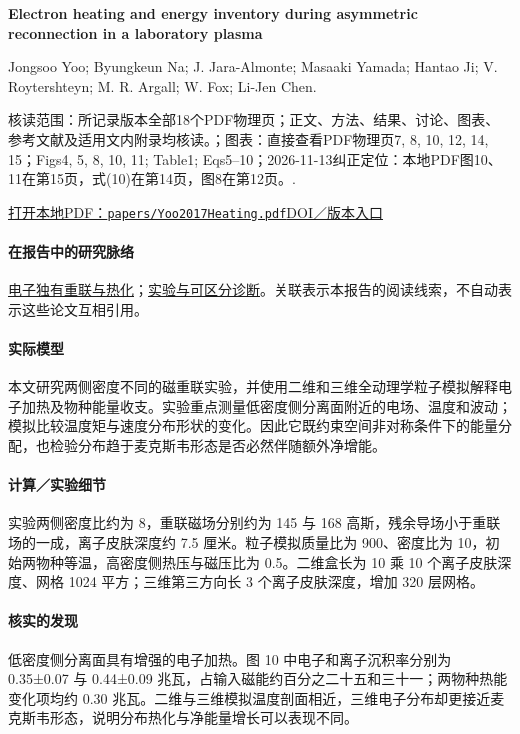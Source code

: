 \textbf{Electron heating and energy inventory during asymmetric reconnection in a laboratory plasma}\citep{Yoo2017Heating}\

Jongsoo Yoo;  Byungkeun Na;  J. Jara-Almonte;  Masaaki Yamada;  Hantao Ji;  V. Roytershteyn;  M. R. Argall;  W. Fox;  Li-Jen Chen.

\textsf{核读范围：}所记录版本全部18个PDF物理页；正文、方法、结果、讨论、图表、参考文献及适用文内附录均核读。；\textsf{图表：}直接查看PDF物理页7, 8, 10, 12, 14, 15；Figs4, 5, 8, 10, 11;  Table1;  Eqs5–10；2026-11-13纠正定位：本地PDF图10、11在第15页，式(10)在第14页，图8在第12页。.

\href{run:papers/Yoo2017Heating.pdf}{打开本地PDF：\texttt{papers/Yoo2017Heating.pdf}}\quad\href{https://doi.org/10.1002/2017JA024152}{DOI／版本入口}

\paragraph{在报告中的研究脉络}\hyperref[story:energy]{电子独有重联与热化}；\hyperref[story:diagnostic]{实验与可区分诊断}。关联表示本报告的阅读线索，不自动表示这些论文互相引用。

\paragraph{实际模型}本文研究两侧密度不同的磁重联实验，并使用二维和三维全动理学粒子模拟解释电子加热及物种能量收支。实验重点测量低密度侧分离面附近的电场、温度和波动；模拟比较温度矩与速度分布形状的变化。因此它既约束空间非对称条件下的能量分配，也检验分布趋于麦克斯韦形态是否必然伴随额外净增能。

\paragraph{计算／实验细节}实验两侧密度比约为 8，重联磁场分别约为 145 与 168 高斯，残余导场小于重联场的一成，离子皮肤深度约 7.5 厘米。粒子模拟质量比为 900、密度比为 10，初始两物种等温，高密度侧热压与磁压比为 0.5。二维盒长为 10 乘 10 个离子皮肤深度、网格 1024 平方；三维第三方向长 3 个离子皮肤深度，增加 320 层网格。

\paragraph{核实的发现}低密度侧分离面具有增强的电子加热。图 10 中电子和离子沉积率分别为 0.35±0.07 与 0.44±0.09 兆瓦，占输入磁能约百分之二十五和三十一；两物种热能变化项均约 0.30 兆瓦。二维与三维模拟温度剖面相近，三维电子分布却更接近麦克斯韦形态，说明分布热化与净能量增长可以表现不同。

